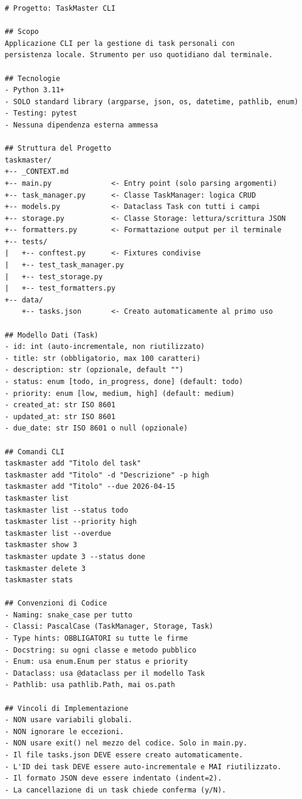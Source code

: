 \begin{lstlisting}[language={},title={\texttt{\_CONTEXT.md} for TaskMaster CLI}]
# Progetto: TaskMaster CLI

## Scopo
Applicazione CLI per la gestione di task personali con
persistenza locale. Strumento per uso quotidiano dal terminale.

## Tecnologie
- Python 3.11+
- SOLO standard library (argparse, json, os, datetime, pathlib, enum)
- Testing: pytest
- Nessuna dipendenza esterna ammessa

## Struttura del Progetto
taskmaster/
+-- _CONTEXT.md
+-- main.py              <- Entry point (solo parsing argomenti)
+-- task_manager.py      <- Classe TaskManager: logica CRUD
+-- models.py            <- Dataclass Task con tutti i campi
+-- storage.py           <- Classe Storage: lettura/scrittura JSON
+-- formatters.py        <- Formattazione output per il terminale
+-- tests/
|   +-- conftest.py      <- Fixtures condivise
|   +-- test_task_manager.py
|   +-- test_storage.py
|   +-- test_formatters.py
+-- data/
    +-- tasks.json       <- Creato automaticamente al primo uso

## Modello Dati (Task)
- id: int (auto-incrementale, non riutilizzato)
- title: str (obbligatorio, max 100 caratteri)
- description: str (opzionale, default "")
- status: enum [todo, in_progress, done] (default: todo)
- priority: enum [low, medium, high] (default: medium)
- created_at: str ISO 8601
- updated_at: str ISO 8601
- due_date: str ISO 8601 o null (opzionale)

## Comandi CLI
taskmaster add "Titolo del task"
taskmaster add "Titolo" -d "Descrizione" -p high
taskmaster add "Titolo" --due 2026-04-15
taskmaster list
taskmaster list --status todo
taskmaster list --priority high
taskmaster list --overdue
taskmaster show 3
taskmaster update 3 --status done
taskmaster delete 3
taskmaster stats

## Convenzioni di Codice
- Naming: snake_case per tutto
- Classi: PascalCase (TaskManager, Storage, Task)
- Type hints: OBBLIGATORI su tutte le firme
- Docstring: su ogni classe e metodo pubblico
- Enum: usa enum.Enum per status e priority
- Dataclass: usa @dataclass per il modello Task
- Pathlib: usa pathlib.Path, mai os.path

## Vincoli di Implementazione
- NON usare variabili globali.
- NON ignorare le eccezioni.
- NON usare exit() nel mezzo del codice. Solo in main.py.
- Il file tasks.json DEVE essere creato automaticamente.
- L'ID dei task DEVE essere auto-incrementale e MAI riutilizzato.
- Il formato JSON deve essere indentato (indent=2).
- La cancellazione di un task chiede conferma (y/N).
\end{lstlisting}

